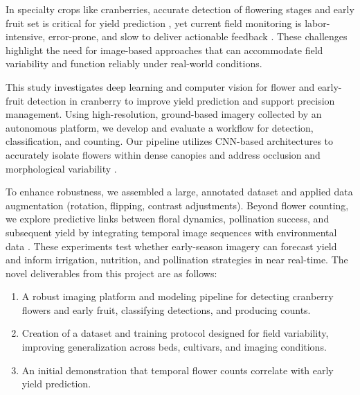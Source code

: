In specialty crops like cranberries, accurate detection of flowering stages and early fruit set is critical for yield prediction \cite{coombe_development_1980}, yet current field monitoring is labor-intensive, error-prone, and slow to deliver actionable feedback \cite{pozdnyakova_estimation_2002}. These challenges highlight the need for image-based approaches that can accommodate field variability and function reliably under real-world conditions.

This study investigates deep learning and computer vision for flower and early-fruit detection in cranberry to improve yield prediction and support precision management. Using high-resolution, ground-based imagery collected by an autonomous platform, we develop and evaluate a workflow for detection, classification, and counting. Our pipeline utilizes CNN-based architectures to accurately isolate flowers within dense canopies and address occlusion and morphological variability \cite{ghosh_understanding_2019}.

To enhance robustness, we assembled a large, annotated dataset and applied data augmentation (rotation, flipping, contrast adjustments). Beyond flower counting, we explore predictive links between floral dynamics, pollination success, and subsequent yield by integrating temporal image sequences with environmental data \cite{brown_fruit_2006,parent_current_2021}. These experiments test whether early-season imagery can forecast yield and inform irrigation, nutrition, and pollination strategies in near real-time. The novel deliverables from this project are as follows:

\par\medskip 

\begin{spacing}{1}
\begin{enumerate}[label=(\arabic*), leftmargin=2em, labelsep=0.6em, align=left,
                  itemsep=8pt, parsep=0pt, topsep=0pt, partopsep=0pt]
  \item A robust imaging platform and modeling pipeline for detecting cranberry flowers and early fruit, classifying detections, and producing counts.
  \item Creation of a dataset and training protocol designed for field variability, improving generalization across beds, cultivars, and imaging conditions.
  \item An initial demonstration that temporal flower counts correlate with early yield prediction.
\end{enumerate}
\end{spacing}

